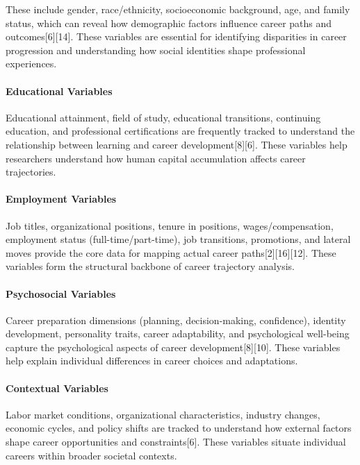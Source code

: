 \documentclass[./main.tex]{subfiles}
\begin{document}
These include gender, race/ethnicity, socioeconomic background, age, and
family status, which can reveal how demographic factors influence career
paths and outcomes{[}6{]}{[}14{]}. These variables are essential for
identifying disparities in career progression and understanding how
social identities shape professional experiences.

\paragraph{Educational Variables}\label{educational-variables}

Educational attainment, field of study, educational transitions,
continuing education, and professional certifications are frequently
tracked to understand the relationship between learning and career
development{[}8{]}{[}6{]}. These variables help researchers understand
how human capital accumulation affects career trajectories.

\paragraph{Employment Variables}\label{employment-variables}

Job titles, organizational positions, tenure in positions,
wages/compensation, employment status (full-time/part-time), job
transitions, promotions, and lateral moves provide the core data for
mapping actual career paths{[}2{]}{[}16{]}{[}12{]}. These variables form
the structural backbone of career trajectory analysis.

\paragraph{Psychosocial Variables}\label{psychosocial-variables}

Career preparation dimensions (planning, decision-making, confidence),
identity development, personality traits, career adaptability, and
psychological well-being capture the psychological aspects of career
development{[}8{]}{[}10{]}. These variables help explain individual
differences in career choices and adaptations.

\paragraph{Contextual Variables}\label{contextual-variables}

Labor market conditions, organizational characteristics, industry
changes, economic cycles, and policy shifts are tracked to understand
how external factors shape career opportunities and constraints{[}6{]}.
These variables situate individual careers within broader societal
contexts.
\end{document}
